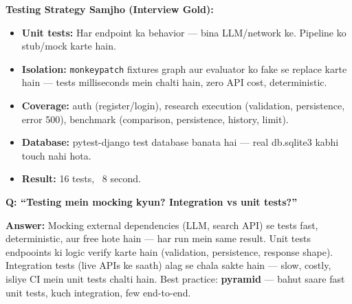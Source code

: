 \documentclass[11pt, a4paper]{article}
\begin{document}
\begin{codestorybox}
\textbf{Testing Strategy Samjho (Interview Gold):}
\begin{itemize}
\item \textbf{Unit tests:} Har endpoint ka behavior --- bina LLM/network ke. Pipeline ko stub/mock karte hain.
\item \textbf{Isolation:} \texttt{monkeypatch} fixtures graph aur evaluator ko fake se replace karte hain --- tests milliseconds mein chalti hain, zero API cost, deterministic.
\item \textbf{Coverage:} auth (register/login), research execution (validation, persistence, error 500), benchmark (comparison, persistence, history, limit).
\item \textbf{Database:} pytest-django test database banata hai --- real db.sqlite3 kabhi touch nahi hota.
\item \textbf{Result:} 16 tests, ~8 second.
\end{itemize}
\end{codestorybox}

\begin{interviewbox}
\textbf{Q: ``Testing mein mocking kyun? Integration vs unit tests?''}

\textbf{Answer:} Mocking external dependencies (LLM, search API) se tests fast, deterministic, aur free hote hain --- har run mein same result. Unit tests endpooints ki logic verify karte hain (validation, persistence, response shape). Integration tests (live APIs ke saath) alag se chala sakte hain --- slow, costly, isliye CI mein unit tests chalti hain. Best practice: \textbf{pyramid} --- bahut saare fast unit tests, kuch integration, few end-to-end.
\end{interviewbox}

\newpage


















\end{document}
